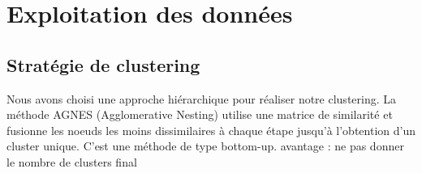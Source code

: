 \section*{Exploitation des données}


\subsection*{Stratégie de clustering}


Nous avons choisi une approche hiérarchique pour réaliser notre clustering.
La méthode AGNES (Agglomerative Nesting) utilise une matrice de similarité et fusionne les noeuds les moins dissimilaires à chaque étape jusqu'à l'obtention d'un cluster unique. C'est une méthode de type bottom-up.
avantage : ne pas donner le nombre de clusters final 

